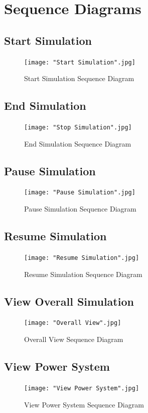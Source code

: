 \documentclass[12pt, titlepage]{article}
\begin{document}
\section{Sequence Diagrams}
\label{sec:sequence_diagrams}
\subsection*{Start Simulation}
\begin{figure}[H]
\centering
\texttt{[image: "Start Simulation".jpg]}
\caption{Start Simulation Sequence Diagram}
\end{figure}
\subsection*{End Simulation}
\begin{figure}[H]
\centering
\texttt{[image: "Stop Simulation".jpg]}
\caption{End Simulation Sequence Diagram}
\end{figure}
\subsection*{Pause Simulation}
\begin{figure}[H]
\centering
\texttt{[image: "Pause Simulation".jpg]}
\caption{Pause Simulation Sequence Diagram}
\end{figure}
\subsection*{Resume Simulation}
\begin{figure}[H]
\centering
\texttt{[image: "Resume Simulation".jpg]}
\caption{Resume Simulation Sequence Diagram}
\end{figure}
\subsection*{View Overall Simulation}
\begin{figure}[H]
\centering
\texttt{[image: "Overall View".jpg]}
\caption{Overall View Sequence Diagram}
\end{figure}
\subsection*{View Power System}
\begin{figure}[H]
\centering
\texttt{[image: "View Power System".jpg]}
\caption{View Power System Sequence Diagram}
\end{figure}
\end{document}
